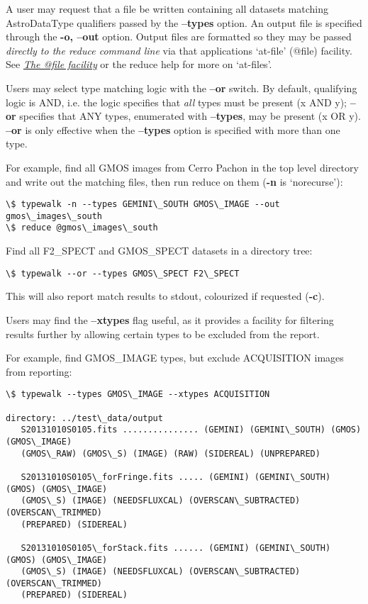 \documentclass[letterpaper,10pt,english]{sphinxmanual}
\begin{document}
A user may request that a file be written containing all datasets
matching AstroDataType qualifiers passed by the \textbf{--types} option. An output
file is specified through the \textbf{-o, --out} option. Output files are formatted
so they may be passed \emph{directly to the reduce command line} via that applications
`at-file' (@file) facility. See {\hyperref[interfaces:atfile]{\emph{The @file facility}}} or the reduce help for more on
`at-files'.

Users may select type matching logic with the \textbf{--or} switch. By default,
qualifying logic is AND, i.e. the logic specifies that \emph{all} types must be
present (x AND y); \textbf{--or} specifies that ANY types, enumerated with
\textbf{--types}, may be present (x OR y). \textbf{--or} is only effective when the
\textbf{--types} option is specified with more than one type.

For example, find all GMOS images from Cerro Pachon in the top level
directory and write out the matching files, then run reduce on them
(\textbf{-n} is `norecurse'):

\begin{Verbatim}[commandchars=\\\{\}]
\$ typewalk -n --types GEMINI\_SOUTH GMOS\_IMAGE --out gmos\_images\_south
\$ reduce @gmos\_images\_south
\end{Verbatim}

Find all F2\_SPECT and GMOS\_SPECT datasets in a directory tree:

\begin{Verbatim}[commandchars=\\\{\}]
\$ typewalk --or --types GMOS\_SPECT F2\_SPECT
\end{Verbatim}

This will also report match results to stdout, colourized if requested (\textbf{-c}).

Users may find the \textbf{--xtypes} flag useful, as it provides a facility for
filtering results further by allowing certain types to be excluded from the
report.

For example, find GMOS\_IMAGE types, but exclude ACQUISITION images from reporting:

\begin{Verbatim}[commandchars=\\\{\}]
\$ typewalk --types GMOS\_IMAGE --xtypes ACQUISITION

directory: ../test\_data/output
   S20131010S0105.fits ............... (GEMINI) (GEMINI\_SOUTH) (GMOS) (GMOS\_IMAGE)
   (GMOS\_RAW) (GMOS\_S) (IMAGE) (RAW) (SIDEREAL) (UNPREPARED)

   S20131010S0105\_forFringe.fits ..... (GEMINI) (GEMINI\_SOUTH) (GMOS) (GMOS\_IMAGE)
   (GMOS\_S) (IMAGE) (NEEDSFLUXCAL) (OVERSCAN\_SUBTRACTED) (OVERSCAN\_TRIMMED)
   (PREPARED) (SIDEREAL)

   S20131010S0105\_forStack.fits ...... (GEMINI) (GEMINI\_SOUTH) (GMOS) (GMOS\_IMAGE)
   (GMOS\_S) (IMAGE) (NEEDSFLUXCAL) (OVERSCAN\_SUBTRACTED) (OVERSCAN\_TRIMMED)
   (PREPARED) (SIDEREAL)
\end{Verbatim}
\end{document}
